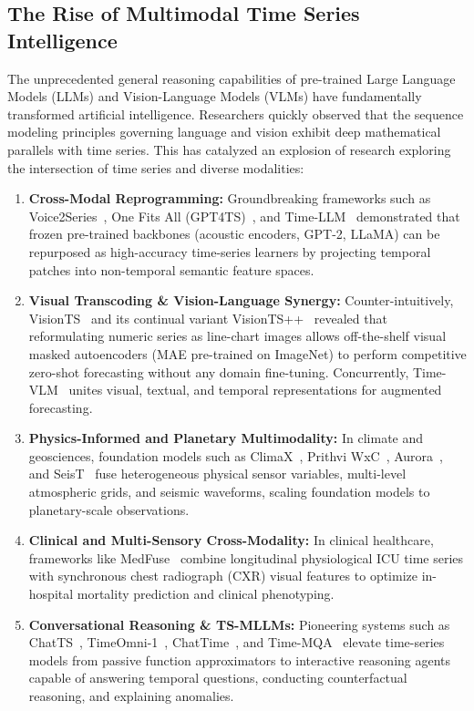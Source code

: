\subsection{The Rise of Multimodal Time Series Intelligence}
The unprecedented general reasoning capabilities of pre-trained Large Language Models (LLMs) and Vision-Language Models (VLMs) have fundamentally transformed artificial intelligence. Researchers quickly observed that the sequence modeling principles governing language and vision exhibit deep mathematical parallels with time series. This has catalyzed an explosion of research exploring the intersection of time series and diverse modalities:
\begin{enumerate}
    \item \textbf{Cross-Modal Reprogramming:} Groundbreaking frameworks such as Voice2Series~\cite{Yang2021Voice2Series}, One Fits All (GPT4TS)~\cite{Zhou2023OneFitsAll}, and Time-LLM~\cite{Jin2023TimeLLM} demonstrated that frozen pre-trained backbones (acoustic encoders, GPT-2, LLaMA) can be repurposed as high-accuracy time-series learners by projecting temporal patches into non-temporal semantic feature spaces.
    \item \textbf{Visual Transcoding \& Vision-Language Synergy:} Counter-intuitively, VisionTS~\cite{Chen2024VisionTS} and its continual variant VisionTS++~\cite{Chen2025VisionTSPlus} revealed that reformulating numeric series as line-chart images allows off-the-shelf visual masked autoencoders (MAE pre-trained on ImageNet) to perform competitive zero-shot forecasting without any domain fine-tuning. Concurrently, Time-VLM~\cite{Zhong2025TimeVLM} unites visual, textual, and temporal representations for augmented forecasting.
    \item \textbf{Physics-Informed and Planetary Multimodality:} In climate and geosciences, foundation models such as ClimaX~\cite{Nguyen2023ClimaX}, Prithvi WxC~\cite{Schmude2024PrithviWxC}, Aurora~\cite{Bodnar2024Aurora}, and SeisT~\cite{Zhang2024SeisT} fuse heterogeneous physical sensor variables, multi-level atmospheric grids, and seismic waveforms, scaling foundation models to planetary-scale observations.
    \item \textbf{Clinical and Multi-Sensory Cross-Modality:} In clinical healthcare, frameworks like MedFuse~\cite{Hayat2022MedFuse} combine longitudinal physiological ICU time series with synchronous chest radiograph (CXR) visual features to optimize in-hospital mortality prediction and clinical phenotyping.
    \item \textbf{Conversational Reasoning \& TS-MLLMs:} Pioneering systems such as ChatTS~\cite{Zhao2024ChatTS}, TimeOmni-1~\cite{Tan2025TimeOmni1}, ChatTime~\cite{ChatTime2024}, and Time-MQA~\cite{Shen2025TimeMQA} elevate time-series models from passive function approximators to interactive reasoning agents capable of answering temporal questions, conducting counterfactual reasoning, and explaining anomalies.

\end{enumerate}
